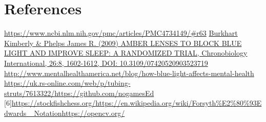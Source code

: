 \documentclass[onecolumn]{IEEEtran}
\begin{document}
\pagebreak
\section{References}
\noindent [1] \href{https://www.ncbi.nlm.nih.gov/pmc/articles/PMC4734149/\#r63}{https://www.ncbi.nlm.nih.gov/pmc/articles/PMC4734149/\#r63} \newline
[2] \href{https://www.tandfonline.com/doi/abs/10.3109/07420520903523719?casa_token=xuj5yeT4EWEAAAAA\%3ADS5C1NhfiI1XBogq05OfmNmXPNALfdGdCkl8oOSUKUsNgLJZQW5dzziJ_a5yXX3H1YCVc57m8jc\&}{Burkhart Kimberly \& Phelps James R. (2009) AMBER LENSES TO BLOCK BLUE LIGHT AND IMPROVE SLEEP: A RANDOMIZED TRIAL, Chronobiology International, 26:8, 1602-1612, DOI: 10.3109/07420520903523719} \newline
[3] \href{http://www.mentalhealthamerica.net/blog/how-blue-light-affects-mental-health}{http://www.mentalhealthamerica.net/blog/how-blue-light-affects-mental-health} \newline
[4]\href{https://uk.rs-online.com/web/p/tubing-struts/7613322/}{https://uk.rs-online.com/web/p/tubing-struts/7613322/}\newline
[5]\href{https://github.com/nogamesEd}{https://github.com/nogamesEd}
[6]\href{https://stockfishchess.org/}{https://stockfishchess.org/}\newline
[7]\href{https://en.wikipedia.org/wiki/Forsyth\%E2\%80\%93Edwards\_ Notation}
{https://en.wikipedia.org/wiki/Forsyth\%E2\%80\%93Edwards\_ Notation}\newline
[8]\href{https://opencv.org/}{https://opencv.org/}
\end{document}
